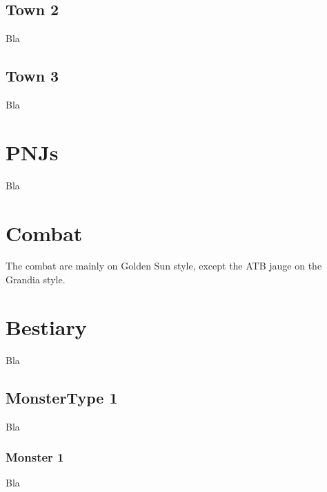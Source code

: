 \documentclass[a4paper,12pt]{book}
\begin{document}
\subsection{Town 2}
Bla
\subsection{Town 3}
Bla
\section{PNJs}
Bla
\section{Combat}
The combat are mainly on Golden Sun style, except the ATB jauge on the Grandia style.
\section{Bestiary}
Bla
\subsection{MonsterType 1}
Bla
\subsubsection{Monster 1}
Bla
\end{document}
